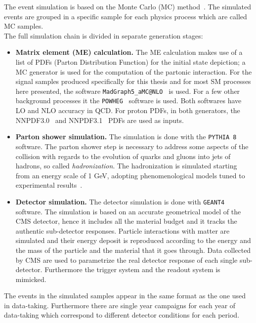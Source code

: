 The event simulation is based on the Monte Carlo (MC)
method~\cite{mc}. The simulated events
 are grouped in a specific
sample for each physics process which are called MC samples.\\
The full simulation chain is divided in separate generation stages:
\begin{itemize}
\setlength\itemsep{-0.1em}
\item \textbf{Matrix element (ME) calculation.} The ME calculation
  makes use of a list of PDFs (Parton Distribution Function) for the initial state
  depiction; a MC generator is used for the computation of the
  partonic interaction.
 For the signal samples produced specifically for this thesis and for
  most SM processes here presented, the software
  \texttt{MadGraph5\_aMC@NLO}~\cite{Alwall_2014} is used. For a few other background processes it
  the \texttt{POWHEG}~\cite{Alioli_2010} software is used. Both
  softwares have LO and NLO accuracy in QCD. For proton PDFs, in both
  generators, the NNPDF3.0~\cite{Ball_2015} and
  NNPDF3.1~\cite{Ball_2017} PDFs are used as inputs.
\item \textbf{Parton shower simulation.} The simulation is done with
  the \texttt{PYTHIA 8}~\cite{Sj_strand_2008, Sj_strand_2015}
  software. The parton shower step is necessary to address some aspects
  of the collision with regards to the evolution of quarks and gluons into jets of
  hadrons, so called \emph{hadronization}. The hadronization is
  simulated starting from an energy scale of 1 GeV, adopting phenomenological models tuned to
  experimental results~\cite{Skands_2014, Khachatryan_2016_ps, Sirunyan_2020_ps}.
\item \textbf{Detector simulation.} The detector simulation is done
  with \texttt{GEANT4}~\cite{AGOSTINELLI2003250} software. The
  simulation is based on an accurate geometrical model of the CMS
  detector, hence it includes all the material budget and it tracks
  the authentic sub-detector responses. Particle interactions with
  matter are simulated and their energy deposit is reproduced according to the
  energy and the mass of the particle and the material that it goes through. Data collected by CMS are used to
  parametrize the real detector response of each single
  sub-detector. Furthermore the trigger system and the readout system
  is mimicked. 
\end{itemize}

The events in the simulated samples appear in the same format as the
one used in data-taking. Furthermore there are single year campaigns for
each year of data-taking which correspond to different detector
conditions for each period. 
 

